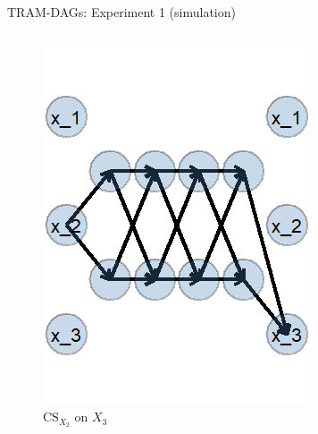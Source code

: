 \documentclass[onlytextwidth,english]{beamer}\usepackage[]{graphicx}\usepackage[]{xcolor}
\begin{document}
\begin{frame}{TRAM-DAGs: Experiment 1 (simulation)}
\begin{columns}
\begin{column}{0.35\textwidth}
\begin{figure}
  \centering
  \includegraphics[width=0.65\linewidth]{img/CS.png}
  \caption{$\text{CS}_{X_2}$ on $X_3$}
\end{figure}
\end{column}

\end{columns}

\end{frame}


%         
\end{document}
